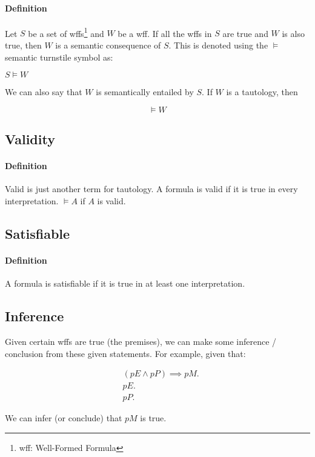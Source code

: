 \documentclass{article}
\begin{document}
\begin{multicols}{2}
  \paragraph{Definition} Let $S$ be a set of wffs\footnote{wff: Well-Formed Formula} and $W$ be a wff. If all the wffs in $S$ are true and $W$ is also true, then $W$ is a semantic consequence of $S$. This is denoted using the $\vDash$ semantic turnstile symbol as:
  
  $S \vDash W$
  
  \noindent We can also say that $W$ is semantically entailed by $S$. If $W$ is a tautology, then
  
  $$\vDash W$$
  
  \subsection{Validity}
  
  \paragraph{Definition} Valid is just another term for tautology. A formula is valid if it is true in every interpretation. $\vDash A$ if $A$ is valid.
  
  \subsection{Satisfiable}
  
  \paragraph{Definition} A formula is satisfiable if it is true in at least one interpretation.
  
  \subsection{Inference}
  
  Given certain wffs are true (the premises), we can make some inference / conclusion from these given statements. For example, given that:
  
  \begin{align*}
  & (pE \land pP) \implies pM.\\
  & pE.\\
  & pP.
  \end{align*}
  
  We can infer (or conclude) that $pM$ is true. 
  

\end{multicols}
\end{document}
